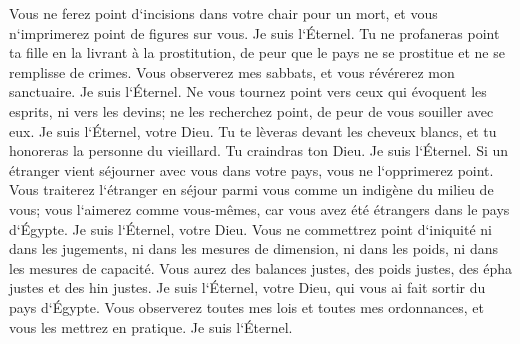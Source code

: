 \verse Vous ne ferez point d`incisions dans votre chair pour un mort, et vous n`imprimerez point de figures sur vous. Je suis l`Éternel. 
\verse Tu ne profaneras point ta fille en la livrant à la prostitution, de peur que le pays ne se prostitue et ne se remplisse de crimes. 
\verse Vous observerez mes sabbats, et vous révérerez mon sanctuaire. Je suis l`Éternel. 
\verse Ne vous tournez point vers ceux qui évoquent les esprits, ni vers les devins; ne les recherchez point, de peur de vous souiller avec eux. Je suis l`Éternel, votre Dieu. 
\verse Tu te lèveras devant les cheveux blancs, et tu honoreras la personne du vieillard. Tu craindras ton Dieu. Je suis l`Éternel. 
\verse Si un étranger vient séjourner avec vous dans votre pays, vous ne l`opprimerez point. 
\verse Vous traiterez l`étranger en séjour parmi vous comme un indigène du milieu de vous; vous l`aimerez comme vous-mêmes, car vous avez été étrangers dans le pays d`Égypte. Je suis l`Éternel, votre Dieu. 
\verse Vous ne commettrez point d`iniquité ni dans les jugements, ni dans les mesures de dimension, ni dans les poids, ni dans les mesures de capacité. 
\verse Vous aurez des balances justes, des poids justes, des épha justes et des hin justes. Je suis l`Éternel, votre Dieu, qui vous ai fait sortir du pays d`Égypte. 
\verse Vous observerez toutes mes lois et toutes mes ordonnances, et vous les mettrez en pratique. Je suis l`Éternel. 

